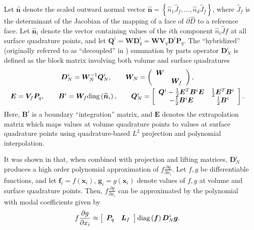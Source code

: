 \documentclass{svjour3}                     %
\renewcommand{\hat}{\widehat}
\newcommand{\diag}[1]{{\rm diag}\LRp{#1}}
\newcommand{\pd}[2]{\frac{\partial#1}{\partial#2}}
\newcommand{\LRp}[1]{\left( #1 \right)}
\newcommand{\LRs}[1]{\left[ #1 \right]}
\newcommand{\LRc}[1]{\left\{ #1 \right\}}
\begin{document}
Let $\hat{\bm{n}}$ denote the scaled outward normal vector $\hat{\bm{n}} = \LRc{\hat{n}_1\hat{J}_f,\ldots,\hat{n}_d\hat{J}_f}$, where $\hat{J}_f$ is the determinant of the Jacobian of the mapping of a face of $\partial \hat{D}$ to a reference face.  Let $\hat{\bm{n}}_i$ denote the vector containing values of the $i$th component $\hat{n}_i\hat{J}f$ at all surface quadrature points, and let $\bm{Q}^i = \bm{W}\bm{D}^i_q = \bm{W}\bm{V}_q\bm{D}^i\bm{P}_q$.  The ``hybridized'' (originally referred to as ``decoupled'' in \cite{chan2017discretely}) summation by parts operator $\bm{D}^i_N$ is defined as the block matrix involving both volume and surface quadratures
\begin{gather}
\bm{D}^i_N = \bm{W}_N^{-1} \bm{Q}^i_N, \qquad \bm{W}_N = \LRp{\begin{array}{cc}\bm{W}&\\ & \bm{W}_f\end{array}}, \label{eq:QN}\\
\bm{E} = \bm{V}_f\bm{P}_q, \qquad \bm{B}^i = \bm{W}_f \diag{\hat{\bm{n}}_i}, \qquad \bm{Q}^i_N  = \LRs{
\begin{array}{cc}
\bm{Q}^i - \frac{1}{2}\bm{E}^T\bm{B}^i\bm{E} &  \frac{1}{2}\bm{E}^T\bm{B}^i\\
-\frac{1}{2}\bm{B}^i\bm{E} & \frac{1}{2} \bm{B}^i
\end{array}}.  \nonumber
\end{gather}
Here, $\bm{B}^i$ is a boundary ``integration'' matrix, and $\bm{E}$ denotes the extrapolation matrix which maps values at volume quadrature points to values at surface quadrature points using quadrature-based $L^2$ projection and polynomial interpolation.  

It was shown in \cite{chan2017discretely, chan2018efficient} that, when combined with projection and lifting matrices, $\bm{D}^i_N$ produces a high order polynomial approximation of $f\pd{g}{x_i}$. 
Let $f, g$ be differentiable functions, and let $\bm{f}_i = f(\bm{x}_i)$, $\bm{g}_i = g(\bm{x}_i)$ denote values of $f,g$ at volume and surface quadrature points.  Then, $f\pd{g}{x_i}$ can be approximated by the polynomial with modal coefficients given by
\begin{gather}
f\pd{g}{x_i} \approx \LRs{\begin{array}{cc}
\bm{P}_q & \bm{L}_f\end{array}} {\rm diag}\LRp{\bm{f}}\bm{D}^i_N \bm{g}.  
\label{eq:dnapprox}
\end{gather}
\end{document}
